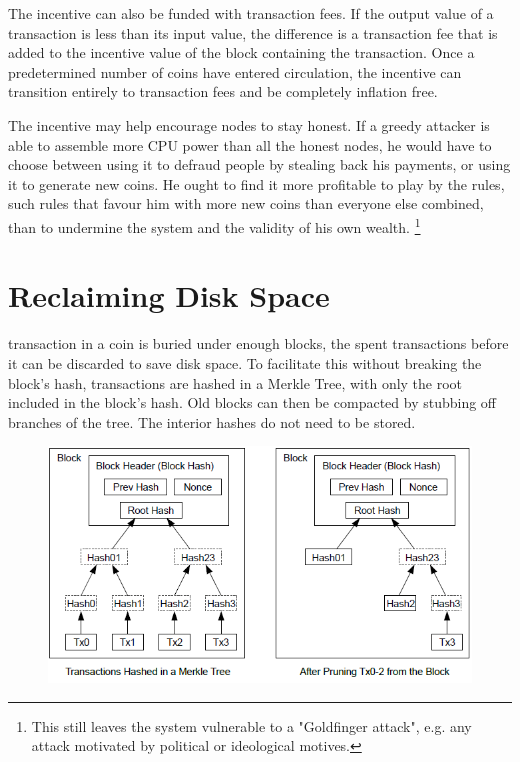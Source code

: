 \documentclass[nohyper]{tufte-handout}
\begin{document}
The incentive can also be funded with transaction fees. If the output
value of a transaction is less than its input value, the difference is a
transaction fee that is added to the incentive value of the block
containing the transaction. Once a predetermined number of coins have
entered circulation, the incentive can transition entirely to
transaction fees and be completely inflation free.

The incentive may help encourage nodes to stay honest. If a greedy
attacker is able to assemble more CPU power than all the honest nodes,
he would have to choose between using it to defraud people by stealing
back his payments, or using it to generate new coins. He ought to find
it more profitable to play by the rules, such rules that favour him with
more new coins than everyone else combined, than to undermine the system
and the validity of his own wealth.  \footnote{This still leaves the system vulnerable to a "Goldfinger attack", e.g. any attack motivated by political or ideological motives.}

\section{Reclaiming Disk Space}\label{reclaiming-disk-space}

 transaction in a coin is buried under enough blocks, the
spent transactions before it can be discarded to save disk space. To
facilitate this without breaking the block's hash, transactions are
hashed in a Merkle Tree\cite{mer80}\cite{mas99}\cite{hab97}, with only the root included in the block's hash. Old
blocks can then be compacted by stubbing off branches of the tree. The
interior hashes do not need to be stored.

\begin{figure}[!h]
\centering
\includegraphics[width=0.75\linewidth]{reclaiming-disk.png}
\end{figure}
\end{document}
